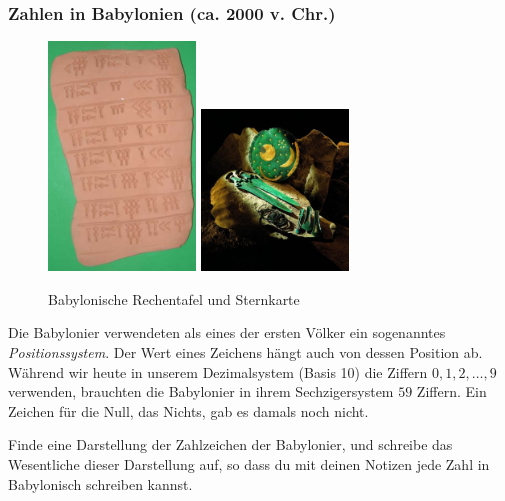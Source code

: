 \documentclass[%
11pt,%
twoside,%
titlepage,%
german,%
]{scrartcl}
\begin{document}
\subsubsection{Zahlen in Babylonien (ca. 2000 v. Chr.)}
\begin{figure}[h]
\begin{center}
\includegraphics[width=0.35\textwidth]{pictures/babylontafel}\hspace*{0.2cm}
\includegraphics[width=0.35\textwidth]{pictures/babylonuhr}
\end{center}
\caption{Babylonische Rechentafel und Sternkarte}
\end{figure}
Die Babylonier verwendeten als eines der ersten V\"olker ein sogenanntes \emph{Positionssystem}. Der Wert eines Zeichens h\"angt auch von dessen Position ab. W\"ahrend wir heute in unserem Dezimalsystem (Basis 10) die Ziffern $0, 1, 2, \dots, 9$ verwenden, brauchten die Babylonier in ihrem Sechzigersystem $59$ Ziffern. Ein Zeichen f\"ur die Null, das \glqq Nichts\grqq, gab es damals noch nicht.
\begin{ueb}[Zahlzeichen]
Finde eine Darstellung der Zahlzeichen der Babylonier, und schreibe das Wesentliche dieser Darstellung auf, so dass du mit deinen Notizen jede Zahl in Babylonisch schreiben kannst.
\end{ueb}
\end{document}

